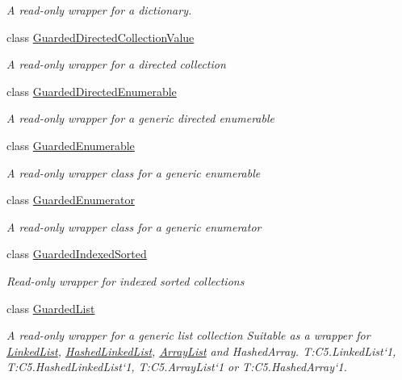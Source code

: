 \begin{DoxyCompactItemize}
\begin{DoxyCompactList}\small\item\em A read-\/only wrapper for a dictionary. \end{DoxyCompactList}\item 
class \hyperlink{class_c5_1_1_guarded_directed_collection_value}{Guarded\+Directed\+Collection\+Value}
\begin{DoxyCompactList}\small\item\em A read-\/only wrapper for a directed collection \end{DoxyCompactList}\item 
class \hyperlink{class_c5_1_1_guarded_directed_enumerable}{Guarded\+Directed\+Enumerable}
\begin{DoxyCompactList}\small\item\em A read-\/only wrapper for a generic directed enumerable \end{DoxyCompactList}\item 
class \hyperlink{class_c5_1_1_guarded_enumerable}{Guarded\+Enumerable}
\begin{DoxyCompactList}\small\item\em A read-\/only wrapper class for a generic enumerable \end{DoxyCompactList}\item 
class \hyperlink{class_c5_1_1_guarded_enumerator}{Guarded\+Enumerator}
\begin{DoxyCompactList}\small\item\em A read-\/only wrapper class for a generic enumerator \end{DoxyCompactList}\item 
class \hyperlink{class_c5_1_1_guarded_indexed_sorted}{Guarded\+Indexed\+Sorted}
\begin{DoxyCompactList}\small\item\em Read-\/only wrapper for indexed sorted collections \end{DoxyCompactList}\item 
class \hyperlink{class_c5_1_1_guarded_list}{Guarded\+List}
\begin{DoxyCompactList}\small\item\em A read-\/only wrapper for a generic list collection {\itshape Suitable as a wrapper for \hyperlink{class_c5_1_1_linked_list}{Linked\+List}, \hyperlink{class_c5_1_1_hashed_linked_list}{Hashed\+Linked\+List}, \hyperlink{class_c5_1_1_array_list}{Array\+List} and Hashed\+Array. T\+:\+C5.\+Linked\+List`1, T\+:\+C5.\+Hashed\+Linked\+List`1, T\+:\+C5.\+Array\+List`1 or T\+:\+C5.\+Hashed\+Array`1. } \end{DoxyCompactList}\item 

\end{DoxyCompactItemize}
